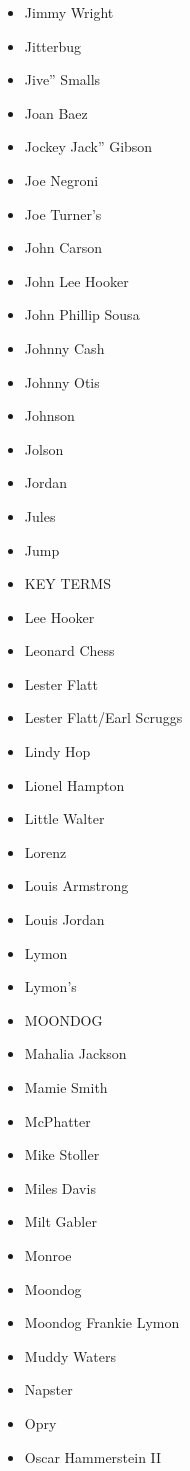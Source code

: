 \documentclass[12pt,a4paper]{article}
\begin{document}
\begin{itemize}
  \item Jimmy Wright
  \item Jitterbug
  \item Jive'' Smalls
  \item Joan Baez
  \item Jockey Jack'' Gibson
  \item Joe Negroni
  \item Joe Turner's
  \item John Carson
  \item John Lee Hooker
  \item John Phillip Sousa
  \item Johnny Cash
  \item Johnny Otis
  \item Johnson
  \item Jolson
  \item Jordan
  \item Jules
  \item Jump
  \item KEY TERMS
  \item Lee Hooker
  \item Leonard Chess
  \item Lester Flatt
  \item Lester Flatt/Earl Scruggs
  \item Lindy Hop
  \item Lionel Hampton
  \item Little Walter
  \item Lorenz
  \item Louis Armstrong
  \item Louis Jordan
  \item Lymon
  \item Lymon's
  \item MOONDOG
  \item Mahalia Jackson
  \item Mamie Smith
  \item McPhatter
  \item Mike Stoller
  \item Miles Davis
  \item Milt Gabler
  \item Monroe
  \item Moondog
  \item Moondog Frankie Lymon
  \item Muddy Waters
  \item Napster
  \item Opry
  \item Oscar Hammerstein II

\end{itemize}
\end{document}
